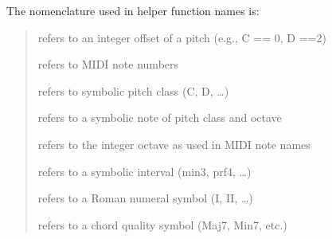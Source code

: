 \documentclass[letterpaper,10pt,english]{sphinxmanual}
\begin{document}
\sphinxAtStartPar
The nomenclature used in helper function names is:
\begin{quote}
\begin{description}
\sphinxAtStartPar
refers to an integer offset of a pitch (e.g., C == 0, D ==2)

\sphinxAtStartPar
refers to MIDI note numbers

\sphinxAtStartPar
refers to symbolic pitch class (C, D, …)

\sphinxAtStartPar
refers to a symbolic note of pitch class and octave

\sphinxAtStartPar
refers to the integer octave as used in MIDI note names

\sphinxAtStartPar
refers to a symbolic interval (min\sphinxhyphen{}3, prf\sphinxhyphen{}4, …)

\sphinxAtStartPar
refers to a Roman numeral symbol (I, II, …)

\sphinxAtStartPar
refers to a chord quality symbol (Maj7, Min7, etc.)

\end{description}
\end{quote}
\end{document}
